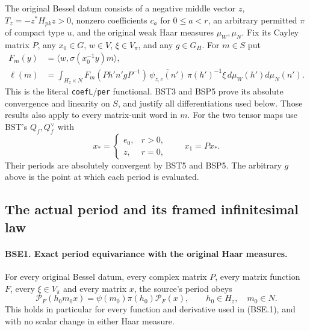 \documentclass[11pt,a4paper]{article}
\numberwithin{equation}{section}
\theoremstyle{remark}\newtheorem{remark}[theorem]{Remark}
\begin{document}
The original Bessel datum consists of a negative middle vector $z$,
$T_z=-z^*H_{pk}z>0$, nonzero coefficients $c_a$ for $0\le a<r$,
an arbitrary permitted $\pi$ of compact type $u$, and the original
weak Haar measures $\mu_W,\mu_N$.  Fix its Cayley matrix $P$,
any $x_0\in G$, $w\in V$, $\xi\in V_\pi$, and any $g\in G_H$.
For $m\in S$ put
\[
 \begin{split}
 F_m(y)&=\langle w,\sigma(x_0^{-1}y)m\rangle,\\
 \ell(m)&=\int_{H_z\times N}
       F_m(P h'n'gP^{-1})\,
       \overline{\psi_{z,c}(n')}\,\pi(h')^{-1}\xi\,
                    d\mu_W(h')d\mu_N(n').
 \end{split}
 \tag{BSE.1}
\]
This is the literal \texttt{coef\allowbreak L}/\texttt{per} functional.
BST3 and BSP5 prove its absolute convergence and linearity on $S$,
and justify all differentiations used below.  Those results also
apply to every matrix-unit word in $m$.
For the two tensor maps use BST's $Q_f,Q_f^\vee$ with
\[
 x_*= \begin{cases}e_0,&r>0,\\ z,&r=0,\end{cases}
                  \qquad x_1=P x_* .
 \tag{BSE.2}
\]
Their periods are absolutely convergent by BST5 and BSP5.
The arbitrary $g$ above is the point at which each period is evaluated.

\subsection{The actual period and its framed infinitesimal law}

\paragraph{BSE1. Exact period equivariance with the original Haar measures.}
\label{claim:BSE1}
For every original Bessel datum, every complex matrix $P$,
every matrix function $F$, every $\xi\in V_\pi$ and every matrix
$x$, the source's period obeys
\[
 \mathcal P_F(h_0m_0x)
       =\psi(m_0)\pi(h_0)\mathcal P_F(x),
       \qquad h_0\in H_z,\quad m_0\in N.
 \tag{BSE.3}
\]
This holds in particular for every function and derivative used in
(BSE.1), and with no scalar change in either Haar measure.
\end{document}
